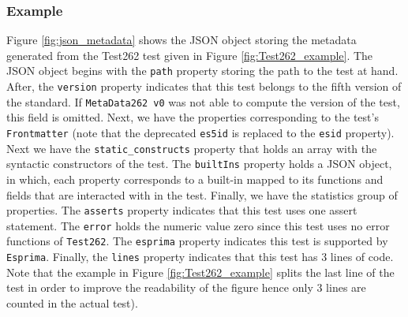 \documentclass[runningheads]{llncs}
\begin{document}
\subsubsection{Example}

Figure \ref{fig:json_metadata} shows the JSON object storing the metadata generated from the Test262 test given in Figure \ref{fig:Test262_example}.
The JSON object begins with the \texttt{path} property storing the path to the test at hand. After, the \texttt{version} property indicates that this test belongs to the fifth version of the standard. If \texttt{MetaData262 v0} was not able to compute the version of the test, this field is omitted. Next, we have the properties corresponding to the test's \texttt{Frontmatter} (note that the deprecated \texttt{es5id} is replaced to the \texttt{esid} property).
Next we have the \texttt{static\_constructs} property that holds an array with the syntactic constructors of the test. The \texttt{builtIns} property holds a JSON object, in which, each property corresponds to a built-in mapped to its functions and fields that are interacted with in the test. Finally, we have the statistics group of properties. The \texttt{asserts} property indicates that this test uses one assert statement. The \texttt{error} holds the numeric value zero since this test uses no error functions of \texttt{Test262}. The \texttt{esprima} property indicates this test is supported by \texttt{Esprima}. Finally, the \texttt{lines} property indicates that this test has 3 lines of code. Note that the example in Figure \ref{fig:Test262_example} splits the last line of the test in order to improve the readability of the figure hence only 3 lines are counted in the actual test).
\end{document}
